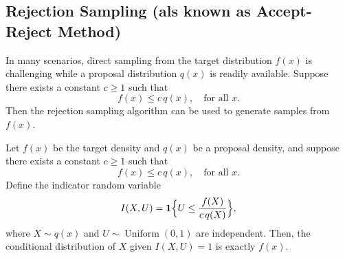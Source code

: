 \documentclass[11pt, headings=standardclasses, parskip=half, twoside]{scrartcl}
\begin{document}
\subsection{Rejection Sampling (als known as Accept-Reject Method)}
\label{subsec:rejection}
In many scenarios, direct sampling from the target distribution \(f(x)\) is challenging while a proposal distribution \(q(x)\) is readily available. Suppose there exists a constant \(c\ge 1\) such that
\[
f(x)\le c\,q(x),\quad \text{for all } x.
\]
Then the rejection sampling algorithm can be used to generate samples from \(f(x)\).
\begin{center}
\end{center}

\begin{theorem}\label{thm:rej}
Let \(f(x)\) be the target density and \(q(x)\) be a proposal density, and suppose there exists a constant \(c\ge 1\) such that
\[
f(x)\le c\,q(x),\quad \text{for all } x.
\]
Define the indicator random variable
\[
I(X,U)=\mathbf{1}\Bigl\{U\le \frac{f(X)}{c\,q(X)}\Bigr\},
\]
where \(X\sim q(x)\) and \(U\sim \operatorname{Uniform}(0,1)\) are independent. Then, the conditional distribution of \(X\) given \(I(X,U)=1\) is exactly \(f(x)\).
\end{theorem}
\end{document}
